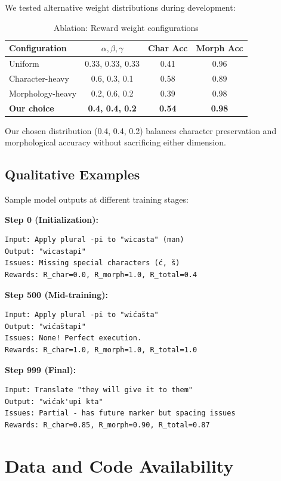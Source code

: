 \documentclass{article}
\begin{document}
We tested alternative weight distributions during development:

\begin{table}[h]
\centering
\caption{Ablation: Reward weight configurations}
\begin{tabular}{lccc}
\toprule
\textbf{Configuration} & $\alpha, \beta, \gamma$ & \textbf{Char Acc} & \textbf{Morph Acc} \\
\midrule
Uniform & 0.33, 0.33, 0.33 & 0.41 & 0.96 \\
Character-heavy & 0.6, 0.3, 0.1 & 0.58 & 0.89 \\
Morphology-heavy & 0.2, 0.6, 0.2 & 0.39 & 0.98 \\
\textbf{Our choice} & \textbf{0.4, 0.4, 0.2} & \textbf{0.54} & \textbf{0.98} \\
\bottomrule
\end{tabular}
\end{table}

Our chosen distribution (0.4, 0.4, 0.2) balances character preservation and morphological accuracy without sacrificing either dimension.

\subsection{Qualitative Examples}

Sample model outputs at different training stages:

\textbf{Step 0 (Initialization):}
\begin{verbatim}
Input: Apply plural -pi to "wicasta" (man)
Output: "wicastapi"
Issues: Missing special characters (ć, š)
Rewards: R_char=0.0, R_morph=1.0, R_total=0.4
\end{verbatim}

\textbf{Step 500 (Mid-training):}
\begin{verbatim}
Input: Apply plural -pi to "wićašta" 
Output: "wićaštapi"
Issues: None! Perfect execution.
Rewards: R_char=1.0, R_morph=1.0, R_total=1.0
\end{verbatim}

\textbf{Step 999 (Final):}
\begin{verbatim}
Input: Translate "they will give it to them"
Output: "wićak'upi kta"
Issues: Partial - has future marker but spacing issues
Rewards: R_char=0.85, R_morph=0.90, R_total=0.87
\end{verbatim}

\section{Data and Code Availability}
\end{document}

